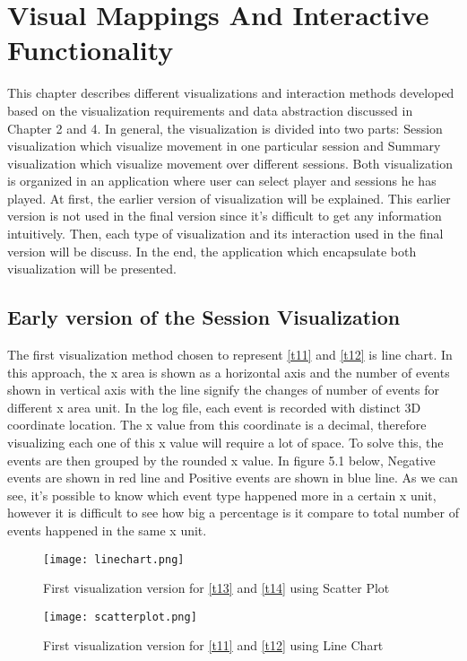 \chapter{Visual Mappings And Interactive Functionality}
This chapter describes different visualizations and interaction methods developed based on the visualization requirements and data abstraction discussed in Chapter 2 and 4. In general, the visualization is divided into two parts: Session visualization which visualize movement in one particular session and Summary visualization which visualize movement over different sessions. Both visualization is organized in an application where user can select player and sessions he has played. At first, the earlier version of visualization will be explained. This earlier version is not used in the final version since it's difficult to get any information intuitively. Then, each type of visualization and its interaction used in the final version will be discuss. In the end, the application which encapsulate both visualization will be presented.

\section{Early version of the Session Visualization}
The first visualization method chosen to represent \ref{t11} and \ref{t12} is line chart. In this approach, the x area is shown as a horizontal axis and the number of events shown in vertical axis with the line signify the changes of number of events for different x area unit. In the log file, each event is recorded with distinct 3D coordinate location. The x value from this coordinate is a decimal, therefore visualizing each one of this x value will require a lot of space. To solve this, the events are then grouped by the rounded x value. In figure 5.1 below, Negative events are shown in red line and Positive events are shown in blue line. As we can see, it's possible to know which event type happened more in a certain x unit, however it is difficult to see how big a percentage is it compare to total number of events happened in the same x unit.

\begin{figure}
\centering
\texttt{[image: linechart.png]}
\caption{First visualization version for \ref{t13} and \ref{t14} using Scatter Plot}
\end{figure}

\begin{figure}
\centering
\texttt{[image: scatterplot.png]}
\caption{First visualization version for \ref{t11} and \ref{t12} using Line Chart}
\end{figure}

